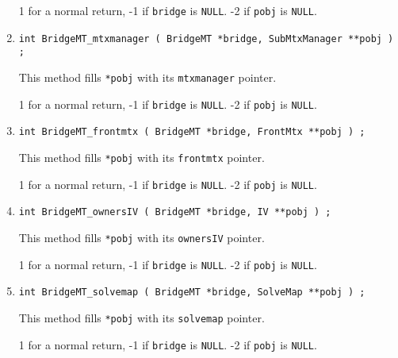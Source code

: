 \begin{enumerate}
\par {}
1 for a normal return, 
-1 if \texttt{bridge} is \texttt{NULL}.
-2 if \texttt{pobj} is \texttt{NULL}.
\item
\begin{verbatim}
int BridgeMT_mtxmanager ( BridgeMT *bridge, SubMtxManager **pobj ) ;
\end{verbatim}
This method fills \texttt{*pobj} with its \texttt{mtxmanager} pointer.
\par {}
1 for a normal return, 
-1 if \texttt{bridge} is \texttt{NULL}.
-2 if \texttt{pobj} is \texttt{NULL}.
\item
\begin{verbatim}
int BridgeMT_frontmtx ( BridgeMT *bridge, FrontMtx **pobj ) ;
\end{verbatim}
This method fills \texttt{*pobj} with its \texttt{frontmtx} pointer.
\par {}
1 for a normal return, 
-1 if \texttt{bridge} is \texttt{NULL}.
-2 if \texttt{pobj} is \texttt{NULL}.
\item
\begin{verbatim}
int BridgeMT_ownersIV ( BridgeMT *bridge, IV **pobj ) ;
\end{verbatim}
This method fills \texttt{*pobj} with its \texttt{ownersIV} pointer.
\par {}
1 for a normal return, 
-1 if \texttt{bridge} is \texttt{NULL}.
-2 if \texttt{pobj} is \texttt{NULL}.
\item
\begin{verbatim}
int BridgeMT_solvemap ( BridgeMT *bridge, SolveMap **pobj ) ;
\end{verbatim}
This method fills \texttt{*pobj} with its \texttt{solvemap} pointer.
\par {}
1 for a normal return, 
-1 if \texttt{bridge} is \texttt{NULL}.
-2 if \texttt{pobj} is \texttt{NULL}.

\end{enumerate}
